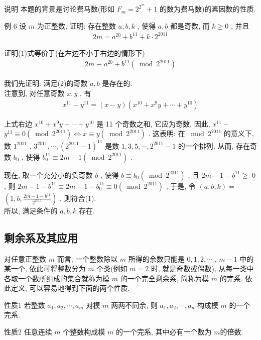 	说明 本题的背景是讨论费马数(形如 $F_{m}=2^{2^{m}}+1$ 的数为费马数)的素因数的性质.

	例 6 设 $m$ 为正整数, 证明: 存在整数 $a ,  b ,  k$ , 使得 $a ,  b$ 都是奇数, 而 $k \geqslant 0$ , 并且
	\begin{align*}
		2 m=a^{20}+b^{11}+k \cdot 2^{2011}
	\end{align*}

	证明(1)式等价于(在左边不小于右边的情形下)
	\begin{align*}
		2 m \equiv a^{20}+b^{11}\left(\bmod 2^{2011}\right)
	\end{align*}

	我们先证明: 满足(2)的奇数 $a ,  b$ 是存在的.\\
	注意到, 对任意奇数 $x ,  y$ , 有
	\begin{align*}
		x^{11}-y^{11}=(x-y)\left(x^{10}+x^{9} y+\cdots+y^{10}\right)
	\end{align*}

	上式右边 $x^{10}+x^{9} y+\cdots+y^{10}$ 是 11 个奇数之和, 它应为奇数, 因此,  $x^{11}-$ $y^{11} \equiv 0\left(\bmod 2^{2011}\right) \Leftrightarrow x \equiv y\left(\bmod 2^{2011}\right)$ . 这表明: 在 $\bmod 2^{2011}$ 的意义下, 数 $1^{2011}$ ,  $3^{2011}, \cdots,\left(2^{2011}-1\right)^{11}$ 是数 $1,3,5, \cdots, 2^{2011}-1$ 的一个排列, 从而, 存在奇数 $b_{0}$ , 使得 $b_{0}^{11} \equiv 2 m-1\left(\bmod 2^{2011}\right)$ .

	现在, 取一个充分小的负奇数 $b$ , 使得 $b \equiv b_{0}\left(\bmod 2^{2011}\right)$ , 且 $2 m-1-b^{11} \geqslant$ 0 , 则 $2 m-1-b^{11} \equiv 2 m-1-b_{0}^{11} \equiv 0\left(\bmod 2^{2011}\right)$ , 于是, 令 $(a, b, k)=$\\
$\left(1, b, \frac{2 m-1-b^{11}}{2^{2011}}\right)$ , 则符合(1).\\
	所以, 满足条件的 $a ,  b ,  k$ 存在.

	\subsection{剩余系及其应用}
	对任意正整数 $m$ 而言, 一个整数除以 $m$ 所得的余数只能是 $0,1,2, \cdots$ ,  $m-1$ 中的某一个, 依此可将整数分为 $m$ 个类(例如 $m=2$ 时, 就是奇数或偶数), 从每一类中各取一个数所组成的集合就称为模 $m$ 的一个完全剩余系, 简称为模 $m$ 的完系. 依此定义, 可以容易地得到下面的两个性质.

	性质1 若整数 $a_{1}, a_{2}, \cdots, a_{m}$ 对模 $m$ 两两不同余, 则 $a_{1}, a_{2}, \cdots, a_{n}$ 构成模 $m$ 的一个完系.

	性质2 任意连续 $m$ 个整数构成模 $m$ 的一个完系, 其中必有一个数为 $m$的倍数.

